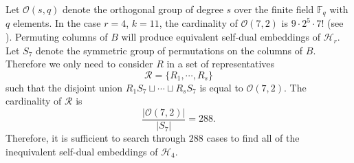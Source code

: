 \documentclass{article}
\theoremstyle{definition}
\theoremstyle{remark}
\begin{document}
Let $\mathcal{O}(s, q)$ denote the orthogonal group of degree $s$ over the finite field $\mathbb{F}_q$ with $q$ elements. In the case $r=4$, $k=11$, the cardinality of $\mathcal{O}(7, 2)$ is  $9\cdot 2^5\cdot 7!$ (see \cite{Macwilliams1969}). Permuting columns of $B$ will produce equivalent self-dual embeddings of $\mathcal{H}_r$. Let $S_7$ denote the symmetric group of permutations on the columns of $B$. Therefore we only need to consider $R$ in a set of representatives
\[
\mathcal{R}=\{R_1, \cdots, R_s\}
\]
such that the disjoint union $R_1S_7 \sqcup \cdots \sqcup R_sS_7$ is equal to $\mathcal{O}(7, 2)$.  The cardinality of $\mathcal{R}$ is
\[
\frac{|\mathcal{O}(7, 2)|}{|S_7|}=288.
\]
Therefore, it is sufficient to search through $288$ cases to find all of the inequivalent self-dual embeddings of $\mathcal{H}_4$.
\end{document}
